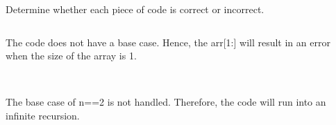 \begin{prob}
    Determine whether each piece of code is correct or
    incorrect.
        \begin{subprobset}
            \begin{subprob}
                \inputminted{python}{\thisdir/include/part_a.py}
                \begin{soln}
                    The code does not have a base case. Hence, the arr[1:] will result in an error when the size of the array is 1.
                \end{soln}  
            \end{subprob}
            \begin{subprob}
                \inputminted{python}{\thisdir/include/part_b.py}
                \begin{soln}
                    \\
                    The base case of n==2 is not handled. Therefore, the code will run into an infinite recursion.
                \end{soln}  
            \end{subprob}
        \end{subprobset}

\end{prob}
